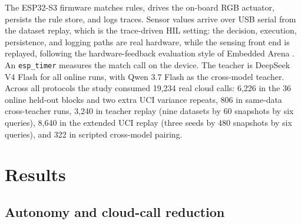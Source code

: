 \documentclass[review]{elsarticle}
\begin{document}
The ESP32-S3 firmware matches rules, drives the on-board RGB actuator,
persists the rule store, and logs traces. Sensor values arrive over USB
serial from the dataset replay, which is the trace-driven HIL setting: the
decision, execution, persistence, and logging paths are real hardware, while
the sensing front end is replayed, following the hardware-feedback evaluation
style of Embedded Arena \cite{31}. An \texttt{esp\_timer} measures the match
call on the device. The teacher is DeepSeek V4 Flash for all online runs,
with Qwen 3.7 Flash as the cross-model teacher. Across all protocols the
study consumed 19,234 real cloud calls: 6,226 in the 36 online held-out
blocks and two extra UCI variance repeats, 806 in same-data cross-teacher
runs, 3,240 in teacher replay (nine
datasets by 60 snapshots by six queries), 8,640 in the extended UCI replay
(three seeds by 480 snapshots by six queries), and 322 in scripted
cross-model pairing.

\section{Results}

\subsection{Autonomy and cloud-call reduction}
\end{document}
